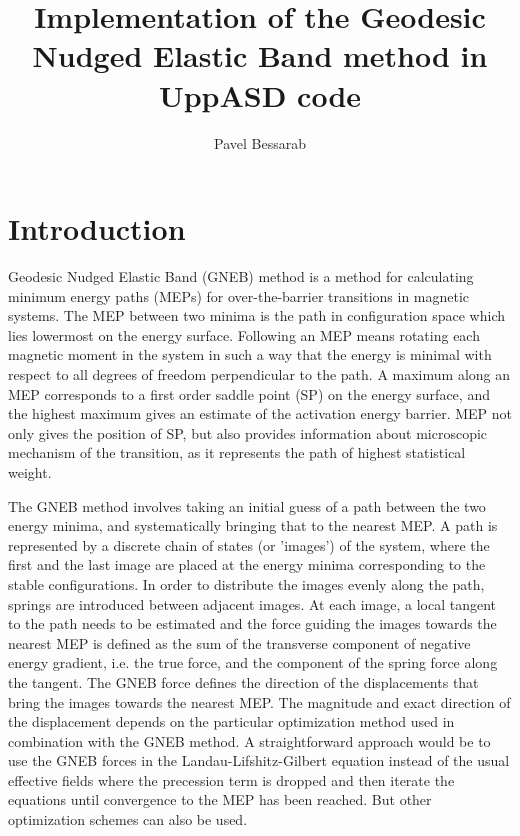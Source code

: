 \documentclass{article}
\begin{document}
\title{Implementation of the Geodesic Nudged Elastic Band method in UppASD code}
\author{Pavel Bessarab}
\maketitle

\section{Introduction}

Geodesic Nudged Elastic Band (GNEB) method is a method for calculating minimum energy paths (MEPs) for over-the-barrier transitions in magnetic systems. The MEP between two minima is the path in configuration space which lies lowermost on the energy surface. Following an MEP means rotating each magnetic moment in the system in such a way that the energy is minimal with respect to all degrees
of freedom perpendicular to the path. A maximum along an MEP corresponds to a first order saddle point (SP) on the energy surface, and the highest maximum gives an estimate of the activation energy barrier. MEP not only gives the position of SP, but also provides information about microscopic mechanism of the transition, as it represents the path of highest statistical weight.  

The GNEB 
method involves taking an initial guess of a path between the two energy minima,
and systematically bringing that to the nearest MEP. A path is
represented by a discrete chain of states (or 'images') of the system, where the first and the last image are placed at the energy minima corresponding to the stable configurations. In order to distribute the images evenly along the path, springs are introduced between adjacent images. At each image, a local tangent to the path needs to be estimated 
and the force guiding the images towards the nearest MEP is defined 
as the sum of the transverse component of negative energy gradient,
i.e. the true force, and the component of the spring force along the tangent.   
The GNEB force defines the direction of the displacements that bring the
images towards the nearest MEP. The magnitude and exact direction of
the displacement depends on the particular optimization method used in
combination with the GNEB method. A straightforward approach would
be to use the GNEB forces in the Landau-Lifshitz-Gilbert equation instead
of the usual effective fields where the precession term is dropped and then
iterate the equations until convergence to the MEP has been reached. But other optimization schemes can also be used.
\end{document}
